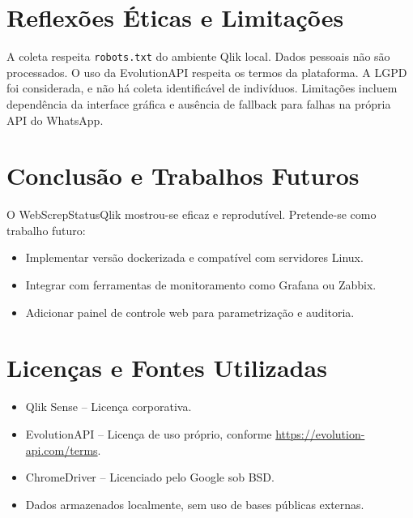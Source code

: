 \documentclass[conference]{IEEEtran}
\begin{document}
\section{Reflexões Éticas e Limitações}
A coleta respeita \texttt{robots.txt} do ambiente Qlik local. Dados pessoais não são processados. O uso da EvolutionAPI respeita os termos da plataforma. A LGPD foi considerada, e não há coleta identificável de indivíduos. Limitações incluem dependência da interface gráfica e ausência de fallback para falhas na própria API do WhatsApp.

\section{Conclusão e Trabalhos Futuros}
O WebScrepStatusQlik mostrou-se eficaz e reprodutível. Pretende-se como trabalho futuro:
\begin{itemize}
  \item Implementar versão dockerizada e compatível com servidores Linux.
  \item Integrar com ferramentas de monitoramento como Grafana ou Zabbix.
  \item Adicionar painel de controle web para parametrização e auditoria.
\end{itemize}

\section*{Licenças e Fontes Utilizadas}
\begin{itemize}
  \item Qlik Sense – Licença corporativa.
  \item EvolutionAPI – Licença de uso próprio, conforme \url{https://evolution-api.com/terms}.
  \item ChromeDriver – Licenciado pelo Google sob BSD.
  \item Dados armazenados localmente, sem uso de bases públicas externas.
\end{itemize}



\end{document}
